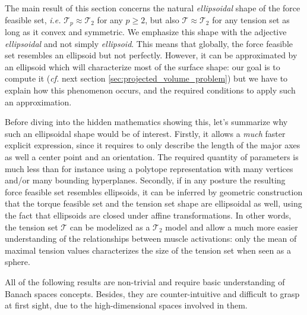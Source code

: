 The main result of this section concerns the natural \emph{ellipsoidal} shape of the force feasible set, \emph{i.e.} $\mathcal{T}_p \approx \mathcal{T}_2$ for any $p\geq 2$, but also $\mathcal{T}\approx \mathcal{T}_2$ for any tension set as long as it convex and symmetric. We emphasize this shape with the adjective \emph{ellipsoidal} and not simply \emph{ellipsoid}. This means that globally, the force feasible set resembles an ellipsoid but not perfectly. However, it can be approximated by an ellipsoid which will characterize most of the surface shape: our goal is to compute it (\emph{cf.} next section \ref{sec:projected_volume_problem}) but we have to explain how this phenomenon occurs, and the required conditions to apply such an approximation.

Before diving into the hidden mathematics showing this, let's summarize why such an ellipsoidal shape would be of interest. Firstly, it allows a \emph{much} faster explicit expression, since it requires to only describe the length of the major axes as well a center point and an orientation. The required quantity of parameters is much less than for instance using a polytope representation with many vertices and/or many bounding hyperplanes. Secondly, if in any posture the resulting force feasible set resembles ellipsoids, it can be inferred by geometric construction that the torque feasible set and the tension set shape are ellipsoidal as well, using the fact that ellipsoids are closed under affine transformations. In other words, the tension set $\mathcal{T}$ can be modelized as a $\mathcal{T}_2$ model and allow a much more easier understanding of the relationships between muscle activations: only the mean of maximal tension values characterizes the size of the tension set when seen as a sphere.

All of the following results are non-trivial and require basic understanding of Banach spaces concepts. Besides, they are counter-intuitive and difficult to grasp at first sight, due to the high-dimensional spaces involved in them.

